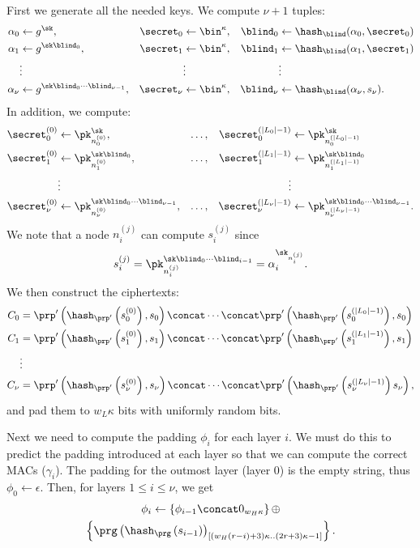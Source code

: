 First we generate all the needed keys.
We compute \(\nu+1\) tuples:
\begin{align*}
  \alpha_0 &\gets g^\sk,
  & \secret_0 &\gets \bin^\kappa,
  & \blind_0 &\gets \hash_\blind(\alpha_0, \secret_0) \\
  \alpha_1 &\gets g^{\sk\blind_0},
  & \secret_1 &\gets \bin^\kappa,
  & \blind_1 &\gets \hash_\blind(\alpha_1, \secret_1) \\
  &\vdots &&\vdots && \vdots \\
  \alpha_\nu &\gets g^{\sk \blind_0\dotsb \blind_{\nu-1}},
  & \secret_\nu &\gets \bin^\kappa,
  & \blind_\nu &\gets \hash_\blind(\alpha_\nu, s_\nu).
\end{align*}
In addition, we compute:
\begin{align*}
  \secret_0^{(0)} &\gets \pk_{n_0^{(0)}}^\sk,
  & \dotsc, &
  & \secret_0^{(|L_0|-1)} &\gets \pk_{n_0^{(|L_0|-1)}}^\sk \\
  \secret_1^{(0)} &\gets \pk_{n_1^{(0)}}^{\sk \blind_0},
  & \dotsc, &
  & \secret_1^{(|L_1|-1)} &\gets \pk_{n_1^{(|L_1|-1)}}^{\sk \blind_0} \\
  & \vdots &&& \vdots \\
  \secret_\nu^{(0)} &\gets \pk_{n_\nu^{(0)}}^{\sk \blind_0\dotsb 
    \blind_{\nu-1}},
  & \dotsc, &
  & \secret_\nu^{(|L_\nu|-1)} &\gets \pk_{n_\nu^{(|L_\nu|-1)}}^{\sk 
    \blind_0\dotsb \blind_{\nu-1}}.
\end{align*}
We note that a node \(n_i^{(j)}\) can compute \(s_i^{(j)}\) since \[
  s_i^{(j)} = \pk_{n_i^{(j)}}^{\sk \blind_0\dotsb \blind_{i-1}} = 
  \alpha_i^{\sk_{n_i^{(j)}}}.
\]
We then construct the ciphertexts:
\begin{align*}
  C_0 &= \prp'\left(\hash_{\prp'}\left(s_0^{(0)}\right), s_0\right)
  \concat \dotsb
  \concat \prp'\left(\hash_{\prp'}\left(s_0^{(|L_0|-1)}\right), s_0\right) \\
  C_1 &= \prp'\left(\hash_{\prp'}\left(s_1^{(0)}\right), s_1\right)
  \concat \dotsb
  \concat \prp'\left(\hash_{\prp'}\left(s_1^{(|L_1|-1)}\right), s_1\right) \\
  & \vdots \\
  C_\nu &= \prp'\left(\hash_{\prp'}\left(s_\nu^{(0)}\right), s_\nu\right)
  \concat \dotsb
  \concat \prp'\left(\hash_{\prp'}\left(s_\nu^{(|L_\nu|-1)}\right) 
    s_\nu\right),
\end{align*}
and pad them to \(w_L\kappa\) bits with uniformly random bits.

Next we need to compute the padding \(\phi_i\) for each layer \(i\).
We must do this to predict the padding introduced at each layer so that we 
can compute the correct \acp{MAC} (\(\gamma_i\)).
The padding for the outmost layer (layer 0) is the empty string, thus \(\phi_0 
  \gets \epsilon\).
Then, for layers \(1\leq i\leq \nu\), we get
\begin{multline*}
  \phi_i\gets \left\{\phi_{i-1}\concat 0_{w_H\kappa}\right\}\oplus \\
  \left\{\prg\left(\hash_\prg\left(s_{i-1}\right)\right)_{[(w_H(r-i)+3)\kappa..(2r+3)\kappa-1]}\right\}.
\end{multline*}

